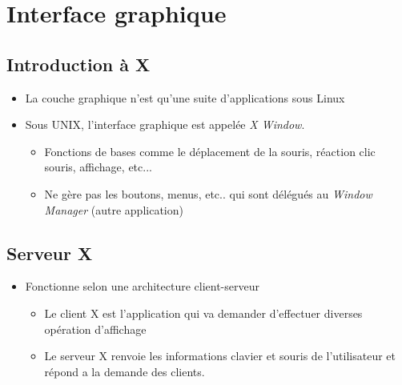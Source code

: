 \documentclass[a4paper]{article}
\begin{document}
    \section{Interface graphique}
    \subsection{Introduction à X}
    \begin{itemize}[label=\textbullet, font=\Large]
      \item La couche graphique n'est qu'une suite d'applications sous Linux
      \item Sous UNIX, l'interface graphique est appelée \emph{X Window}.
      \begin{itemize}[label=, font=\scriptsize]
        \item Fonctions de bases comme le déplacement de la souris, réaction clic souris, affichage, etc...
        \item Ne gère pas les boutons, menus, etc.. qui sont délégués au \emph{Window Manager} (autre application)
      \end{itemize}
    \end{itemize}

    \subsection{Serveur X}
    \begin{itemize}[label=\textbullet, font=\Large]
      \item Fonctionne selon une architecture client-serveur
      \begin{itemize}[label=, font=\scriptsize]
        \item Le client X est l'application qui va demander d'effectuer diverses opération d'affichage
        \item Le serveur X renvoie les informations clavier et souris de l'utilisateur et répond a la demande des clients.
      \end{itemize}
    \end{itemize}
\end{document}
